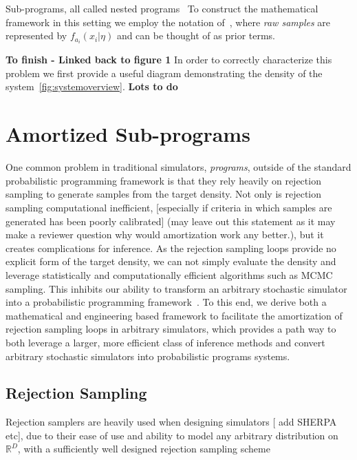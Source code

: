 \documentclass{article}
\begin{document}
Sub-programs, all called nested programs~\cite{}
To construct the mathematical framework in this setting we employ the notation of~\cite{rainforth2017automating}, 
where \emph{raw samples} are represented by $ f_{a_i}(x_i | \eta)$ and can be thought of as prior terms. 

\textbf{To finish - Linked back to figure 1}
In order to correctly characterize this problem we first provide a useful diagram demonstrating 
the density of the system~\ref{fig:systemoverview}. \textbf{Lots to do}

 


%  


\section{Amortized Sub-programs}

One common problem in traditional simulators, \emph{programs}, outside of the standard probabilistic
programming framework is that they rely heavily on rejection sampling 
to generate samples from the target density. Not only is rejection sampling 
computational inefficient, [especially if criteria in which samples are generated
has been poorly calibrated] (may leave out this statement as it may make a reviewer
question why would amortization work any better.), but it creates complications for inference.
As the rejection sampling loops provide no explicit form of the target density,
we can not simply evaluate the density and leverage statistically and computationally
efficient algorithms such as MCMC sampling. This inhibits our ability to transform an arbitrary
stochastic simulator into a probabilistic programming framework~\cite{baydin2018efficient}. 
To this end, we derive both a mathematical and engineering based framework to facilitate 
the amortization of rejection sampling loops in arbitrary simulators, which provides a path
way to both leverage a larger, more efficient class of inference methods and convert arbitrary
stochastic simulators into probabilistic programs systems.

\subsection{Rejection Sampling}

Rejection samplers are heavily used when designing simulators [ add SHERPA etc], due to their ease of use and ability to model 
any arbitrary distribution on $\mathbb{R}^{D}$, with a sufficiently well designed rejection sampling scheme~\cite{MEYER20083408,martino2012improved,casella} 
\end{document}
